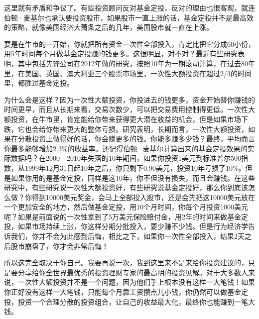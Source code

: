 这里就有矛盾和争议了。有些投资顾问反对基金定投，反对的理由也很客观，就连伯顿·麦基尔也承认要投资股市，如果股市一直上涨的话，基金定投并不是最高效的策略，就像美国经济大萧条之后的几年，美国股市就一直在上涨。

要是在牛市的一开始，你就把所有资金一次性全部投入，肯定比把它分成60小份，用5年时间每个月做基金定投赚的钱更多。这很明显，对不对？最近有些研究表明，其中包括先锋公司在2012年做的研究，按照10年为一期滚动计算，在过去80年里，在美国、英国、澳大利亚三个股票市场里，一次性大额投资在超过2/3的时间里，都胜过基金定投。

为什么会是这样？因为一次性大额投资，你投进去的钱更多，资金开始替你赚钱的时间更早，而且从长期来看，交易次数少，可以把交易费用控制得更低。一次性大额投资，在牛市里，肯定能给你带来获得更大潜在收益的机会，但是如果市场下跌，它也会给你带来更大的整体亏损。研究表明，长期而言，一次性大额投资，如果在分散投资上做得好的话，你会赚更多的钱。你能多赚多少钱？最终，平均而言你最多能够增加2.3\%的收益率。还记得伯顿·麦基尔计算出来的基金定投效果的实际数据吗？在2000—2010年失落的10年期间，如果你投资1美元到标准普尔500指数，从1999年12月31日起10年之后，你只剩下0.90美元，投资10年亏损了10\%。但是如果你用的是基金定投，同样是这10年，你不但没有损失，而且会赚钱。在这些研究中，有些研究说一次性大额投资好，有些研究说基金定投好，那么你到底该怎么做？你得到10000美元奖金，会马上全部投入股市，还是会先把这10000美元放在一个更加安全的地方，然后做基金定投，用10个月时间，你每个月投资1000美元呢？如果是前面说的一次性拿到了5万美元保险赔付金，用2年的时间来做基金定投，如果市场持续上涨，你这样分期分批投入，要少赚不少钱。但是行为经济学告诉我们，你并不会为此感到后悔，相比之下，如果你一次性全部投入，结果2天之后股市崩盘了，你才会非常后悔！

所以这完全取决于你自己。我要再说一次，我到这里来不是来给你投资建议的，只是要分享给你全世界最优秀的投资理财专家的最高明的投资见解。对于大多数人来说，一次性大额投资并不是一个问题，因为他们手上根本没有这样一大笔钱！如果你正好没有这样一大笔钱，只能每个月靠工资攒点儿小钱，你仍然可以做基金定投，投资一个合理分散的投资组合，让自己的收益最大化，最终你也能赚到一笔大钱。
